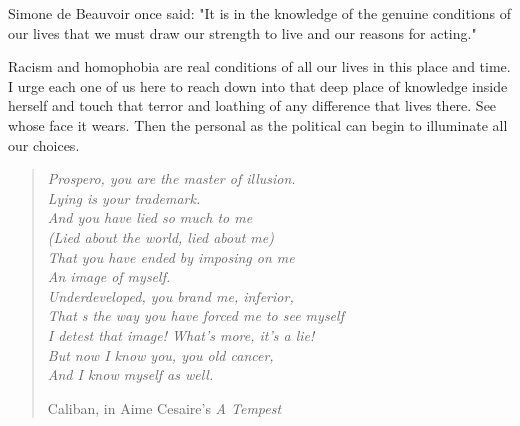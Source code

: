 \documentclass{article}
\begin{document}
Simone de Beauvoir once said: "It is in the knowledge of the genuine conditions of our lives that we must draw our strength to live and our reasons for acting." 

Racism and homophobia are real conditions of all our lives in this place and time. I urge each one of us here to reach down into that deep place of knowledge inside herself and touch that terror and loathing of any difference that lives there. See whose face it wears. Then the personal as the political can begin to illuminate all our choices. 

\begin{quote}
	\emph{
		Prospero, you are the master of illusion.       \\
		Lying is your trademark.                        \\
		And you have lied so much to me                 \\
		(Lied about the world, lied about me)           \\
		That you have ended by imposing on me           \\
		An image of myself.                             \\
		Underdeveloped, you brand me, inferior,         \\
		That s the way you have forced me to see myself \\
		I detest that image! What's more, it's a lie!   \\
		But now I know you, you old cancer,             \\
		And I know myself as well.                      \\
	}

	Caliban, in Aime Cesaire's \emph{A Tempest}
\end{quote}
\end{document}
